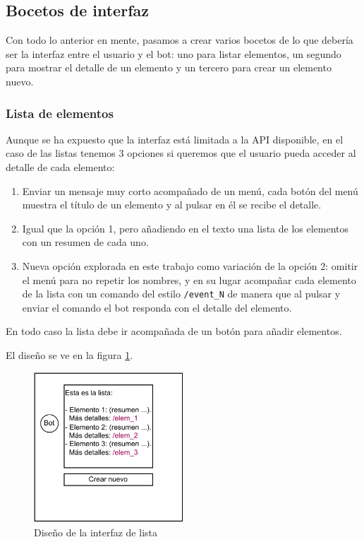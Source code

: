 \subsection{Bocetos de interfaz}

Con todo lo anterior en mente, pasamos a crear varios bocetos de lo que debería ser la interfaz entre el usuario y el bot: uno para listar elementos, un segundo para mostrar el detalle de un elemento y un tercero para crear un elemento nuevo.

\subsubsection{Lista de elementos}

Aunque se ha expuesto que la interfaz está limitada a la API disponible, en el caso de las listas tenemos 3 opciones si queremos que el usuario pueda acceder al detalle de cada elemento:
\begin{enumerate}
    \item Enviar un mensaje muy corto acompañado de un menú, cada botón del menú muestra el título de un elemento y al pulsar en él se recibe el detalle.
    \item Igual que la opción 1, pero añadiendo en el texto una lista de los elementos con un resumen de cada uno.
    \item Nueva opción explorada en este trabajo como variación de la opción 2: omitir el menú para no repetir los nombres, y en su lugar acompañar cada elemento de la lista con un comando del estilo \texttt{/event\_N} de manera que al pulsar y enviar el comando el bot responda con el detalle del elemento.
\end{enumerate}

En todo caso la lista debe ir acompañada de un botón para añadir elementos.

El diseño se ve en la figura \ref{fig:disenyo_lista}.

\begin{figure}[h]
\centering
\includegraphics[width=0.5\textwidth]{imagenes/disenyo_interfaz/lista.drawio.pdf}
\caption{Diseño de la interfaz de lista}
\label{fig:disenyo_lista}
\end{figure}

